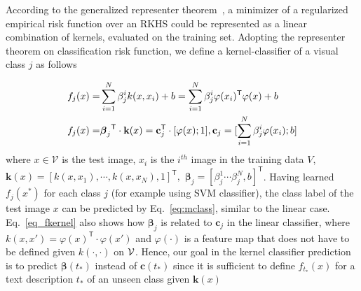 According to the generalized representer theorem~\cite{rth01},  a minimizer of a regularized empirical risk function over an RKHS could be represented as a linear combination of kernels, evaluated on the training set. Adopting the representer theorem on classification risk function, we define a kernel-classifier of a visual class $j$ as follows


\begin{equation}
\small
\begin{split}
f_j({x})=&   \sum_{i=1}^{N} \beta_j^i k({x}, {x}_i) + b  = \sum_{i=1}^{N} \beta_j^i \varphi({x_i})^\textsf{T} \varphi( {x}) + b \\
f_j({x})=&  {\boldsymbol{\beta}_j}^\textsf{T} \cdot  \textbf{k}({x}) =  \mathbf{c}_j^\textsf{T} \cdot [\varphi(x); 1] , \mathbf{c}_j =  [\sum_{i=1}^{N} \beta_j^i \varphi({x_i}); b]\\
\end{split}
\label{eq_fkernel}
\end{equation}
where ${x} \in \mathcal{V}$ is the test image, ${x}_i$ is the $i^{th}$ image in the training data $V$,  $\textbf{k}({x})= [k({x}, {x}_1), \cdots, k({x}, {x}_N), 1]^\textsf{T},$  $\boldsymbol{\beta}_j = [\beta_j^1 \cdots \beta_j^N, b]^\textsf{T} $. Having learned $f_j({x}^*)$ for each class $j$ (for example using SVM classifier), the class label of the test image ${x}$ can be predicted by  Eq.~\ref{eq:mclass}, similar to the linear case. Eq.~\ref{eq_fkernel} also shows how $\boldsymbol{\beta}_j$ is related to $\mathbf{c}_j$ in the linear classifier, where $k(x, x')= \varphi(x)^\mathsf{T} \cdot \varphi(x')$ and $\varphi(\cdot)$ is a feature map  that does not have to be defined given $k(\cdot, \cdot)$ on $\cal{V}$. Hence, our goal in the kernel classifier prediction  is to predict $\boldsymbol{\beta}(t_*)$ instead of $\mathbf{c}(t_*)$ since it is sufficient to define  ${f}_{t_*}(x)$ for a text description $t_*$ of an unseen class given $\mathbf{k}(x)$



